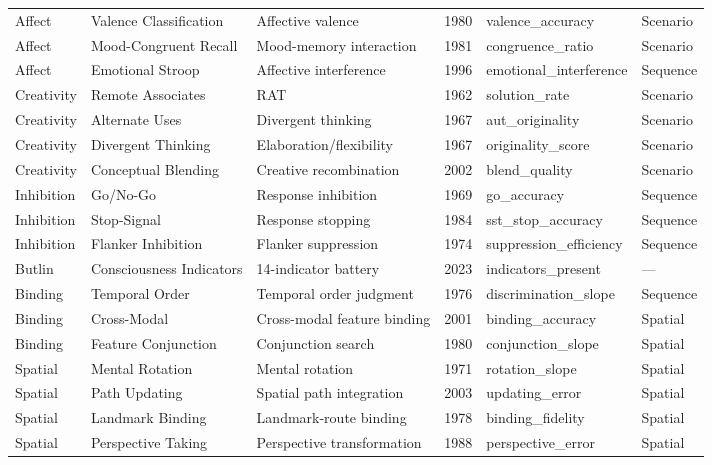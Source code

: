 \documentclass[10pt,landscape]{article}
\begin{document}
\begin{longtable}{@{}p{2.3cm}p{3.0cm}p{4.5cm}p{0.6cm}p{3.8cm}p{1.8cm}@{}}
\midrule
Affect & Valence Classification & Affective valence & 1980 & valence\_accuracy & Scenario \\
Affect & Mood-Congruent Recall & Mood-memory interaction \citep{bower1981mood} & 1981 & congruence\_ratio & Scenario \\
Affect & Emotional Stroop & Affective interference \citep{williams1996emotional} & 1996 & emotional\_interference & Sequence \\

\midrule
Creativity & Remote Associates & RAT \citep{mednick1962associative} & 1962 & solution\_rate & Scenario \\
Creativity & Alternate Uses & Divergent thinking \citep{guilford1967nature} & 1967 & aut\_originality & Scenario \\
Creativity & Divergent Thinking & Elaboration/flexibility & 1967 & originality\_score & Scenario \\
Creativity & Conceptual Blending & Creative recombination \citep{fauconnier2002way} & 2002 & blend\_quality & Scenario \\

\midrule
Inhibition & Go/No-Go & Response inhibition & 1969 & go\_accuracy & Sequence \\
Inhibition & Stop-Signal & Response stopping \citep{logan1984ability} & 1984 & sst\_stop\_accuracy & Sequence \\
Inhibition & Flanker Inhibition & Flanker suppression & 1974 & suppression\_efficiency & Sequence \\

\midrule
Butlin & Consciousness Indicators & 14-indicator battery \citep{butlin2023consciousness} & 2023 & indicators\_present & --- \\

\midrule
Binding & Temporal Order & Temporal order judgment & 1976 & discrimination\_slope & Sequence \\
Binding & Cross-Modal & Cross-modal feature binding & 2001 & binding\_accuracy & Spatial \\
Binding & Feature Conjunction & Conjunction search \citep{treisman1980feature} & 1980 & conjunction\_slope & Spatial \\

\midrule
Spatial & Mental Rotation & Mental rotation \citep{shepard1971mental} & 1971 & rotation\_slope & Spatial \\
Spatial & Path Updating & Spatial path integration & 2003 & updating\_error & Spatial \\
Spatial & Landmark Binding & Landmark-route binding & 1978 & binding\_fidelity & Spatial \\
Spatial & Perspective Taking & Perspective transformation & 1988 & perspective\_error & Spatial \\


\end{longtable}
\end{document}
